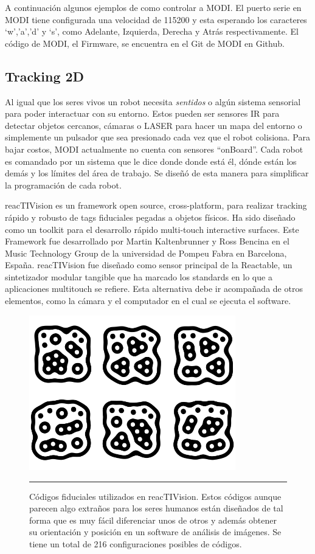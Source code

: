 A continuación algunos ejemplos de como controlar a MODI. El puerto serie en MODI tiene configurada una velocidad de 115200 y esta esperando los caracteres ‘w’,’a’,’d’ y ‘s’, como Adelante, Izquierda, Derecha y Atrás respectivamente. El código de MODI, el Firmware, se encuentra en el Git de MODI en Github.


\subsection{Tracking 2D}
Al igual que los seres vivos un robot necesita \textit{sentidos} o algún sistema sensorial para poder interactuar con su entorno. Estos pueden ser sensores IR para detectar objetos cercanos, cámaras o LASER para hacer un mapa del entorno o simplemente un pulsador que sea presionado cada vez que el robot colisiona. Para bajar costos, MODI actualmente no cuenta con sensores “onBoard”. Cada robot es comandado por un sistema que le dice donde donde está él, dónde están los demás y los límites del área de trabajo. Se diseñó de esta manera para simplificar la programación de cada robot.

reacTIVision es un framework open source, cross-platform, para realizar tracking rápido y robusto de tags fiduciales pegadas a objetos físicos. Ha sido diseñado como un toolkit para el desarrollo rápido multi-touch interactive surfaces. Este Framework fue desarrollado por Martin Kaltenbrunner y Ross Bencina en el Music Technology Group de la universidad de Pompeu Fabra en Barcelona, España. reacTIVision fue diseñado como sensor principal de la Reactable, un sintetizador modular tangible que ha marcado los standards en lo que a aplicaciones multitouch se refiere. Esta alternativa debe ir acompañada de otros elementos, como la cámara y el computador en el cual se ejecuta el software. 


\begin{figure}[htbp]
	\centering
		\includegraphics[width=0.8\textwidth]{./Figures/MODI/fiducial.png}
		\rule{35em}{0.5pt}
	\caption[Fiduciales usados como tag en reacTIVision]{Códigos fiduciales utilizados en reacTIVision. Estos códigos aunque parecen algo extraños para los seres humanos están diseñados de tal forma que es muy fácil diferenciar unos de otros y además obtener su orientación y posición en un software de análisis de imágenes. Se tiene un total de 216 configuraciones posibles de códigos.}
	\label{fig:Fiducial}
\end{figure}



